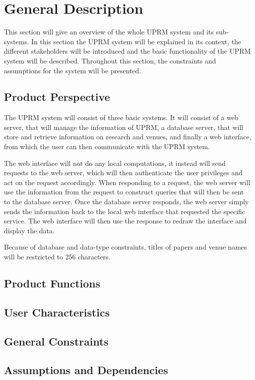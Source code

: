 
\section{General Description}
This section will give an overview of the whole UPRM system and its sub-systems.
In this section the UPRM system will be explained in its context, the different stakeholders will be introduced and the basic functionality of the UPRM system will be described. Throughout this section, the constraints and assumptions for the system will be presented.

	\subsection{Product Perspective}
		The UPRM system will consist of three basic systems. It will consist of a web server, that will manage the information of UPRM, a database server, that will store and retrieve information on research and venues, and finally a web interface, from which the user can then communicate with the UPRM system.
		
		The web interface will not do any local computations, it instead will send requests to the web server, which will then authenticate the user privileges and act on the request accordingly. When responding to a request, the web server will use the information from the request to construct queries that will then be sent to the database server. Once the database server responds, the web server simply sends the information back to the local web interface that requested the specific service. The web interface will then use the response to redraw the interface and display the data.
		
		Because of database and data-type constraints, titles of papers and venue names will be restricted to 256 characters.
	
	\subsection{Product Functions}
	\subsection{User Characteristics}
	\subsection{General Constraints}
	\subsection{Assumptions and Dependencies}
